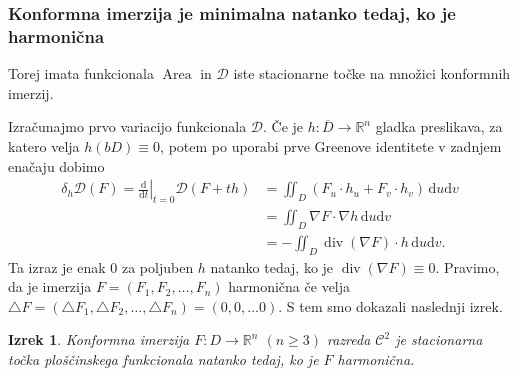 \documentclass[8pt]{beamer}
\theoremstyle{definition}
\theoremstyle{remark}
\theoremstyle{plain}
\newtheorem{izrek}[definicija]{Izrek}
\numberwithin{equation}{section}  %
\begin{document}
\begin{frame}
    \frametitle{Konformna imerzija je minimalna natanko tedaj, ko je harmonična}

    Torej imata funkcionala $\operatorname{Area}$ in $\mathscr{D}$ \textcolor{red1}{iste stacionarne točke na množici konformnih imerzij}.
    \pause
    \vspace{0.8em}

    Izračunajmo prvo variacijo funkcionala $\mathscr{D}$. Če je $h: \overline{D} \rightarrow \mathbb{R}^n$ gladka preslikava, za katero velja $h(bD)\equiv 0$, potem po uporabi prve Greenove identitete v zadnjem enačaju dobimo
    \begin{align*}
        \delta_h \mathscr{D}(F)=\left.\frac{\mathrm{d}}{\mathrm{d} t}\right|_{t=0} \mathscr{D}(F+t h) &=\iint_D\left(F_u \cdot h_u+F_v \cdot h_v\right) \, \mathrm{d} u \mathrm{d} v \\
        &=\iint_D \nabla F \cdot \nabla h \, \mathrm{d} u \mathrm{d} v \\
        &=-\iint_D \operatorname{div}(\nabla F) \cdot h \, \mathrm{d} u \mathrm{d} v.
    \end{align*}
    \pause 
    Ta izraz je enak $0$ za poljuben $h$ natanko tedaj, ko je $\operatorname{div}(\nabla F) \equiv 0$. Pravimo, da je imerzija $F=\left(F_1, F_2, \ldots, F_n\right)$ \textcolor{red1}{harmonična} če velja $\bigtriangleup F=\left(\bigtriangleup F_1, \bigtriangleup F_2, \ldots, \bigtriangleup F_n\right)= (0,0,\ldots 0)$. S tem smo dokazali naslednji izrek.
    \pause
    \begin{izrek}
        Konformna imerzija $F: D \rightarrow \mathbb{R}^n$ $(n \geq 3)$ razreda $\mathscr{C}^2$ je stacionarna točka ploščinskega funkcionala natanko tedaj, ko je $F$ harmonična.
    \end{izrek}

\end{frame}
\end{document}
